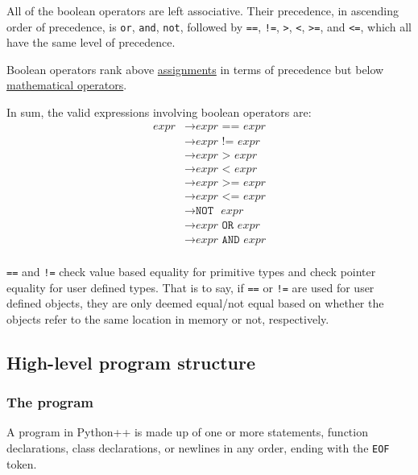 \documentclass{article}
\begin{document}
All of the boolean operators are left associative. Their precedence, in ascending order of precedence, is \texttt{or}, \texttt{and}, \texttt{not}, followed by \texttt{==}, \texttt{!=}, \texttt{>}, \texttt{<}, \texttt{>=}, and \texttt{<=}, which all have the same level of precedence.

Boolean operators rank above \hyperref[sec:assigns]{assignments} in terms of precedence but below \hyperref[sec:expr-mathematical-operators]{mathematical operators}.

In sum, the valid expressions involving boolean operators are:
\begin{align*}
    \textit{expr} &\to \hyperref[sec:expr]{\textit{expr}} \texttt{ == } \hyperref[sec:expr]{\textit{expr}} \\
    &\to \hyperref[sec:expr]{\textit{expr}} \texttt{ != } \hyperref[sec:expr]{\textit{expr}} \\
    &\to \hyperref[sec:expr]{\textit{expr}} \texttt{ > } \hyperref[sec:expr]{\textit{expr}} \\
    &\to \hyperref[sec:expr]{\textit{expr}} \texttt{ < } \hyperref[sec:expr]{\textit{expr}} \\
    &\to \hyperref[sec:expr]{\textit{expr}} \texttt{ >= } \hyperref[sec:expr]{\textit{expr}} \\
    &\to \hyperref[sec:expr]{\textit{expr}} \texttt{ <= } \hyperref[sec:expr]{\textit{expr}} \\
    &\to \texttt{NOT} \texttt{ } \hyperref[sec:expr]{\textit{expr}} \\
    &\to \hyperref[sec:expr]{\textit{expr}} \texttt{ OR } \hyperref[sec:expr]{\textit{expr}} \\
    &\to \hyperref[sec:expr]{\textit{expr}} \texttt{ AND } \hyperref[sec:expr]{\textit{expr}} \\
\end{align*}

\texttt{==} and \texttt{!=} check value based equality for primitive types and check pointer equality for user defined types. That is to say, if \texttt{==} or \texttt{!=} are used for user defined objects, they are only deemed equal/not equal based on whether the objects refer to the same location in memory or not, respectively.

\subsection{High-level program structure}
\subsubsection{The program}
A program in Python++ is made up of one or more statements, function declarations, class declarations, or newlines in any order, ending with the \texttt{EOF} token.
\end{document}
